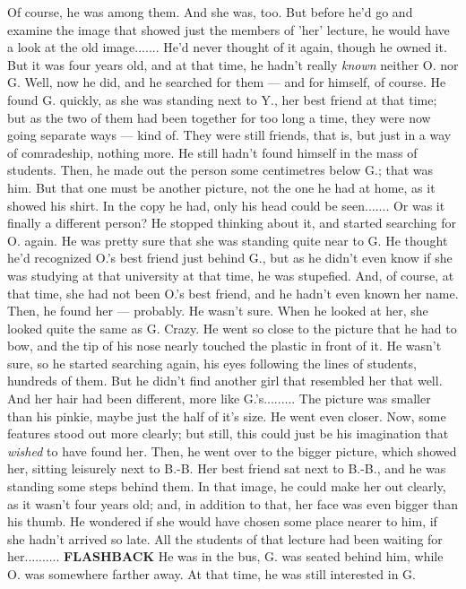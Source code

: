 Of course, he was among them. 
And she was, too. 
But before he'd go and examine the image that showed just the members of 'her' lecture, he would have a look at the old image.......
He'd never thought of it again, though he owned it. 
But it was four years old, and at that time, he hadn't really \emph{known} neither O. nor G. 
Well, now he did, and he searched for them --- and for himself, of course. 
He found G. quickly, as she was standing next to Y., her best friend at that time; but as the two of them had been together for too long a time, they were now going separate ways --- kind of. They were still friends, that is, but just in a way of comradeship, nothing more. 
He still hadn't found himself in the mass of students. 
Then, he made out the person some centimetres below G.; that was him. 
But that one must be another picture, not the one he had at home, as it showed his shirt. In the copy he had, only his head could be seen.......
Or was it finally a different person?
He stopped thinking about it, and started searching for O. again. He was pretty sure that she was standing quite near to G. He thought he'd recognized O.'s best friend just behind G., but as he didn't even know if she was studying at that university at that time, he was stupefied. And, of course, at that time, she had not been O.'s best friend, and he hadn't even known her name. 
Then, he found her --- probably. He wasn't sure. When he looked at her, she looked quite the same as G. Crazy. He went so close to the picture that he had to bow, and the tip of his nose nearly touched the plastic in front of it. 
He wasn't sure, so he started searching again, his eyes following the lines of students, hundreds of them. 
But he didn't find another girl that resembled her that well. And her hair had been different, more like G.'s.........
The picture was smaller than his pinkie, maybe just the half of it's size. 
He went even closer. 
Now, some features stood out more clearly; but still, this could just be his imagination that \emph{wished} to have found her. Then, he went over to the bigger picture, which showed her, sitting leisurely next to B.-B. 
Her best friend sat next to B.-B., and he was standing some steps behind them. In that image, he could make her out clearly, as it wasn't four years old; and, in addition to that, her face was even bigger than his thumb. 
He wondered if she would have chosen some place nearer to him, if she hadn't arrived so late. All the students of that lecture had been waiting for her..........
\textbf{FLASHBACK}
He was in the bus, G. was seated behind him, while O. was somewhere farther away. At that time, he was still interested in G. 
